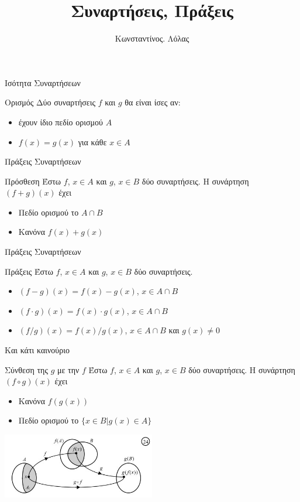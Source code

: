 \documentclass[greek]{beamer}
\title{Συναρτήσεις, Πράξεις}
\author[Λόλας]{Κωνσταντίνος. Λόλας}
\date{}
\begin{document}
\begin{frame}
 \titlepage
\end{frame}
\begin{frame}{Ισότητα Συναρτήσεων}
 \begin{block}{Ορισμός}
  Δύο συναρτήσεις $f$ και $g$ θα είναι ίσες αν:
  \begin{itemize}
   \item έχουν ίδιο πεδίο ορισμού $Α$
   \item $f(x)=g(x)$ για κάθε $x\in Α$
  \end{itemize}
 \end{block}
\end{frame}

\begin{frame}{Πράξεις Συναρτήσεων}
 \begin{block}{Πρόσθεση}
  Έστω $f$, $x\in Α$ και $g$, $x\in Β$ δύο συναρτήσεις. Η συνάρτηση $(f+g)(x)$ έχει
  \begin{itemize}
   \item Πεδίο ορισμού το $A\cap Β$
   \item Κανόνα $f(x)+g(x)$
  \end{itemize}
 \end{block}
\end{frame}

\begin{frame}{Πράξεις Συναρτήσεων}
 \begin{block}{Πράξεις}
  Έστω $f$, $x\in Α$ και $g$, $x\in Β$ δύο συναρτήσεις.
  \begin{itemize}
   \item $(f-g)(x)=f(x)-g(x)$, $x\in A\cap Β$
   \item $(f\cdot g)(x)=f(x)\cdot g(x)$, $x\in A\cap Β$
   \item $(f/g)(x)=f(x)/g(x)$, $x\in A\cap Β$ και $g(x)\ne 0$
  \end{itemize}
 \end{block}
\end{frame}

\begin{frame}{Και κάτι καινούριο}
 \begin{block}{Σύνθεση της $g$ με την $f$}
  Έστω $f$, $x\in Α$ και $g$, $x\in Β$ δύο συναρτήσεις. Η συνάρτηση $(f\circ g)(x)$ έχει
  \begin{itemize}
   \item Κανόνα $f(g(x))$
   \item Πεδίο ορισμού το $\{x\in Β | g(x)\in Α \}$
  \end{itemize}
 \end{block}
 \centering
 \includegraphics[width=0.5\textwidth]{"images/1.2 Σύνθεση.png"}
\end{frame}
\end{document}
